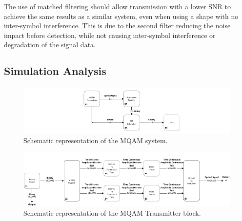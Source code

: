\begin{refsection}
The use of matched filtering should allow transmission with a lower SNR to
achieve the same results as a similar system, even when using a shape with no
inter-symbol interference. This is due to the second filter reducing the noise
impact before detection, while not causing inter-symbol interference or
degradation of the signal data.

\subsection{Simulation Analysis}

\begin{figure}[h]
	\centering
	\includegraphics[width=1\textwidth]{./sdf/m_qam_system/figures/simulation_mqam}
	\caption{Schematic representation of the MQAM system.}\label{fig:MQAM_system_block_diagram}
\end{figure}


\begin{figure}[h]
	\centering
	\includegraphics[width=1\textwidth]{./sdf/m_qam_system/figures/simulation_tx}
	\caption{Schematic representation of the MQAM Transmitter block.}\label{fig:simulation_tx}
\end{figure}



\end{refsection}
